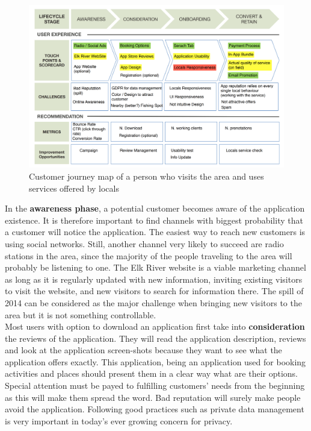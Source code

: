 \begin{figure}[!htb]
\centering
\vspace{-0.5cm}
\includegraphics[width=1.0\textwidth]{Img/Customer_journey_map}
\caption{Customer journey map of a person who visits the area and uses services offered by locals}
\end{figure}
\noindent In the \textbf{awareness phase}, a potential customer becomes aware of the application existence. It is therefore important to find channels with biggest probability that a customer will notice the application. The easiest way to reach new customers is using social networks. Still, another channel very likely to succeed are radio stations in the area, since the majority of the people traveling to the area will probably be listening to one. The Elk River website is a viable marketing channel as long as it is regularly updated with new information, inviting existing visitors to visit the website, and new visitors to search for information there. The spill of 2014 can be considered as the major challenge when bringing new visitors to the area but it is not something controllable.\\
Most users with option to download an application first take into \textbf{consideration} the reviews of the application. They will read the application description, reviews and look at the application screen-shots because they want to see what the application offers exactly. This application, being an application used for booking activities and places should present them in a clear way what are their options. Special attention must be payed to fulfilling customers' needs from the beginning as this will make them spread the word. Bad reputation will surely make people avoid the application. Following good practices such as private data management is very important in today's ever growing concern for privacy.\\
